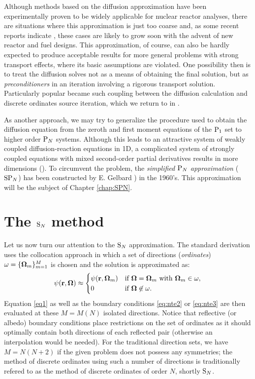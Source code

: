 Although methods based on the diffusion approximation have been experimentally proven to be widely applicable for
nuclear reactor analyses, there are situations where this approximation is just too coarse and, as some recent reports
indicate \cite{Hejzlar1,Cho1}, these cases are likely to grow soon with the advent of new reactor and fuel designs.
This approximation, of course, can also be hardly expected to produce acceptable results for more general problems with
strong transport effects, where its basic assumptions are violated. One possibility then is to treat the diffusion
solves not as a means of obtaining the final solution, but as \textit{preconditioners} in an iteration involving a
rigorous transport solution. Particularly popular became such coupling between the diffusion calculation and discrete
ordinates source iteration, which we return to in .

As another approach, we may try to generalize
the procedure used to obtain the diffusion equation from the zeroth and first moment equations of the $\PN[1]$ set to
higher order $\PN$ systems.
Although this leads to an attractive system of weakly coupled diffusion-reaction equations in 1D, a complicated system
of strongly coupled equations with mixed second-order partial derivatives results in more dimensions (\cite{Capilla}).
To circumvent the problem, the \textit{simplified $\PN$ approximation} ($\SPN$) has been constructed by E. Gelbard
\cite{Gelbard1,Gelbard2}) in the 1960's. This approximation will be the subject of Chapter \ref{chap:SPN}.




\section{The $\SN$ method}\label{sec:1-SN}
Let us now turn our attention to the $\SN$ approximation. The standard derivation uses the
collocation approach in which a set of directions (\textit{ordinates}) 
\mbox{$\omega = \{\bomega_m\}_{m=1}^{M}$} is chosen and the solution is approximated as:
\begin{equation}\label{eq:sn_approx} 
	\psi(\br, \bomega) \approx 
		\pw{\psi(\br,\bomega_m)}{if $\bomega = \bomega_m$ with $\bomega_m \in \omega$}
		   {0}{if $\bomega \not \in \omega$.} 
\end{equation}
Equation \eqref{eq1} as well as the boundary conditions \eqref{eq:nte2} or \eqref{eq:nte3} are then evaluated at these
$M = M(N)$ isolated directions. Notice that reflective (or albedo) boundary conditions place restrictions on the set of
ordinates as it should optimally contain both directions of each reflected pair (otherwise an interpolation would be
needed). For the traditional direction sets, we have $M = N(N+2)$ if the given problem does not possess any symmetries;
the method of discrete ordinates using such a number of directions is traditionally refered to as the method of 
discrete ordinates of order $N$, shortly $\SN$.

